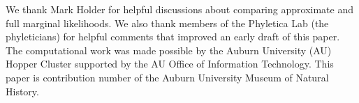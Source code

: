 We thank Mark Holder for helpful discussions about comparing approximate and
full marginal likelihoods.
We also thank  members of the Phyletica Lab (the
phyleticians) for helpful comments that improved an early draft of this paper.
The computational work was made possible by the Auburn University (AU) Hopper
Cluster supported by the AU Office of Information Technology.
This paper is contribution number  of the Auburn University
Museum of Natural History.

